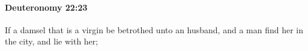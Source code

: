 
		\paragraph{Deuteronomy 22:23} %
			\label{DEUTERONOMY-22-23}

			If a damsel that is a virgin be betrothed unto an husband, and a man find her in the city, and lie with her;


